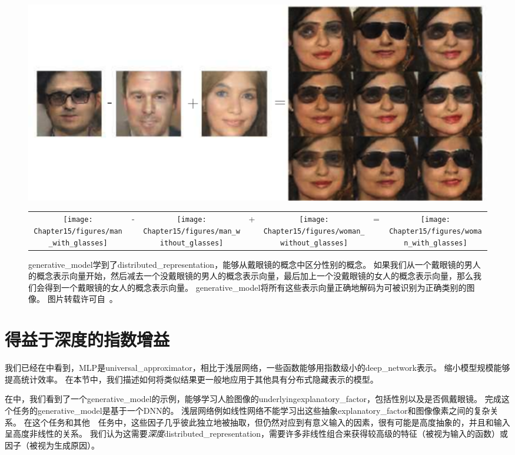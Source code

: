 \begin{figure}[!htb]
\ifOpenSource
\centerline{\includegraphics[scale=0.5]{images/136.png}}
\else
\begin{tabular}{ccccccc}
\texttt{[image: Chapter15/figures/man\_with\_glasses]} &
- &
\texttt{[image: Chapter15/figures/man\_without\_glasses]} &
+ &
\texttt{[image: Chapter15/figures/woman\_without\_glasses]} &
= &
\texttt{[image: Chapter15/figures/woman\_with\_glasses]}
\end{tabular}
\fi
\caption{\gls{generative_model}学到了\gls{distributed_representation}，能够从戴眼镜的概念中区分性别的概念。
如果我们从一个戴眼镜的男人的概念表示向量开始，然后减去一个没戴眼镜的男人的概念表示向量，最后加上一个没戴眼镜的女人的概念表示向量，那么我们会得到一个戴眼镜的女人的概念表示向量。
\gls{generative_model}将所有这些表示向量正确地解码为可被识别为正确类别的图像。
图片转载许可自~\cite{radford2015unsupervised}。
}
\label{fig:chap15_generative_glasses}
\end{figure}


\section{得益于深度的指数增益}
\label{sec:exponential_gains_from_depth}
我们已经在中看到，\gls{MLP}是\gls{universal_approximator}，相比于浅层网络，一些函数能够用指数级小的\gls{deep_network}表示。
缩小模型规模能够提高统计效率。
在本节中，我们描述如何将类似结果更一般地应用于其他具有分布式隐藏表示的模型。


在中，我们看到了一个\gls{generative_model}的示例，能够学习人脸图像的\gls{underlying}\gls{explanatory_factor}，包括性别以及是否佩戴眼镜。
完成这个任务的\gls{generative_model}是基于一个\gls{DNN}的。
浅层网络例如线性网络不能学习出这些抽象\gls{explanatory_factor}和图像像素之间的复杂关系。
在这个任务和其他~~任务中，这些因子几乎彼此独立地被抽取，但仍然对应到有意义输入的因素，很有可能是高度抽象的，并且和输入呈高度非线性的关系。
我们认为这需要\emph{深度}\gls{distributed_representation}，需要许多非线性组合来获得较高级的特征（被视为输入的函数）或因子（被视为生成原因）。

